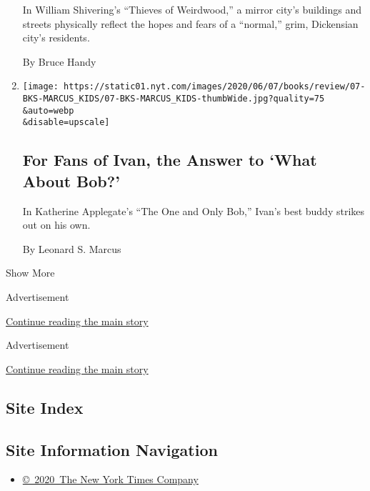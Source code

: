\begin{enumerate}
  In William Shivering's ``Thieves of Weirdwood,'' a mirror city's
  buildings and streets physically reflect the hopes and fears of a
  ``normal,'' grim, Dickensian city's residents.

  By Bruce Handy
\item
  \href{/2020/05/30/books/review/katherine-applegate-the-one-and-only-bob.html}{}

  \texttt{[image: https://static01.nyt.com/images/2020/06/07/books/review/07-BKS-MARCUS\_KIDS/07-BKS-MARCUS\_KIDS-thumbWide.jpg?quality=75\\\&auto=webp\\\&disable=upscale]}

  \hypertarget{for-fans-of-ivan-the-answer-to-what-about-bob}{%
  \subsection{For Fans of Ivan, the Answer to `What About
  Bob?'}\label{for-fans-of-ivan-the-answer-to-what-about-bob}}

  In Katherine Applegate's ``The One and Only Bob,'' Ivan's best buddy
  strikes out on his own.

  By Leonard S. Marcus
\end{enumerate}

Show More

Advertisement

\protect\hyperlink{after-mid2}{Continue reading the main story}

Advertisement

\protect\hyperlink{after-mktg}{Continue reading the main story}

\hypertarget{site-index}{%
\subsection{Site Index}\label{site-index}}

\hypertarget{site-information-navigation}{%
\subsection{Site Information
Navigation}\label{site-information-navigation}}

\begin{itemize}
\tightlist
\item
  \href{https://help.nytimes.com/hc/en-us/articles/115014792127-Copyright-notice}{©~2020~The
  New York Times Company}
\end{itemize}

